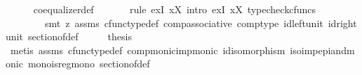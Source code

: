 \begin{isabellebody}
\ \ \ \ \isamarkupfalse%
\ coequalizer{\isacharunderscore}{\kern0pt}def\ \isanewline
\ \ \ \ \isamarkupfalse%
\ {\isacharparenleft}{\kern0pt}rule\ exI{\isacharbrackleft}{\kern0pt}\ x{\isacharequal}{\kern0pt}{\isachardoublequoteopen}X{\isachardoublequoteclose}{\isacharbrackright}{\kern0pt}{\isacharcomma}{\kern0pt}\ intro\ exI{\isacharbrackleft}{\kern0pt}\ x{\isacharequal}{\kern0pt}{\isachardoublequoteopen}X{\isachardoublequoteclose}{\isacharbrackright}{\kern0pt}{\isacharcomma}{\kern0pt}\ typecheck{\isacharunderscore}{\kern0pt}cfuncs{\isacharcomma}{\kern0pt}\isanewline
\ \ \ \ \ \ \ \ smt\ {\isacharparenleft}{\kern0pt}z{}{\isacharparenright}{\kern0pt}\ assms\ cfunc{\isacharunderscore}{\kern0pt}type{\isacharunderscore}{\kern0pt}def\ comp{\isacharunderscore}{\kern0pt}associative{}\ comp{\isacharunderscore}{\kern0pt}type\ id{\isacharunderscore}{\kern0pt}left{\isacharunderscore}{\kern0pt}unit\ id{\isacharunderscore}{\kern0pt}right{\isacharunderscore}{\kern0pt}unit{}\ section{\isacharunderscore}{\kern0pt}of{\isacharunderscore}{\kern0pt}def{\isacharparenright}{\kern0pt}\isanewline
\ \ \isamarkupfalse%
\ \isamarkupfalse%
\ {\isacharquery}{\kern0pt}thesis\isanewline
\ \ \ \ \isamarkupfalse%
\ {\isacharparenleft}{\kern0pt}metis\ assms{\isacharparenleft}{\kern0pt}{}{\isacharparenright}{\kern0pt}\ cfunc{\isacharunderscore}{\kern0pt}type{\isacharunderscore}{\kern0pt}def\ comp{\isacharunderscore}{\kern0pt}monic{\isacharunderscore}{\kern0pt}imp{\isacharunderscore}{\kern0pt}monic{\isacharprime}{\kern0pt}\ id{\isacharunderscore}{\kern0pt}isomorphism\ iso{\isacharunderscore}{\kern0pt}imp{\isacharunderscore}{\kern0pt}epi{\isacharunderscore}{\kern0pt}and{\isacharunderscore}{\kern0pt}monic\ mono{\isacharunderscore}{\kern0pt}is{\isacharunderscore}{\kern0pt}regmono\ section{\isacharunderscore}{\kern0pt}of{\isacharunderscore}{\kern0pt}def{\isacharparenright}{\kern0pt}\isanewline
{}\isamarkupfalse%
%
\endisatagproof
{\isafoldproof}%
%
\isadelimproof
\isanewline
%
\endisadelimproof
%
\isadelimtheory
\isanewline
%
\endisadelimtheory
%
\isatagtheory
{}\isamarkupfalse%
%
\endisatagtheory
{\isafoldtheory}%
%
\isadelimtheory
%
\endisadelimtheory
%
\end{isabellebody}%
\endinput
